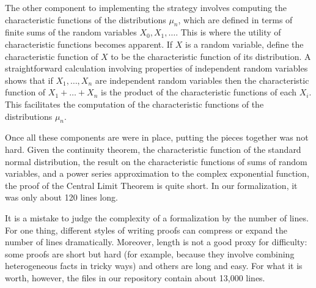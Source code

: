 \documentclass{article}
\begin{document}
The other component to implementing the strategy involves computing the characteristic functions of the distributions $\mu_n$, which are defined in terms of finite sums of the random variables $X_0, X_1, \ldots$. This is where the utility of characteristic functions becomes apparent. If $X$ is a random variable, define the characteristic function of $X$ to be the characteristic function of its distribution. A straightforward calculation involving properties of independent random variables shows that if $X_1, \ldots, X_n$ are independent random variables then the characteristic function of $X_1 + \ldots + X_n$ is the product of the characteristic functions of each $X_i$. This facilitates the computation of the characteristic functions of the distributions $\mu_n$. 

Once all these components are were in place, putting the pieces together was not hard. Given the continuity theorem, the characteristic function of the standard normal distribution, the result on the characteristic functions of sums of random variables, and a power series approximation to the complex exponential function, the proof of the Central Limit Theorem is quite short. In our formalization, it was only about 120 lines long. 

It is a mistake to judge the complexity of a formalization by the number of lines. For one thing, different styles of writing proofs can compress or expand the number of lines dramatically. Moreover, length is not a good proxy for difficulty: some proofs are short but hard (for example, because they involve combining heterogeneous facts in tricky ways) and others are long and easy. For what it is worth, however, the files in our repository contain about 13,000 lines.



\end{document}
